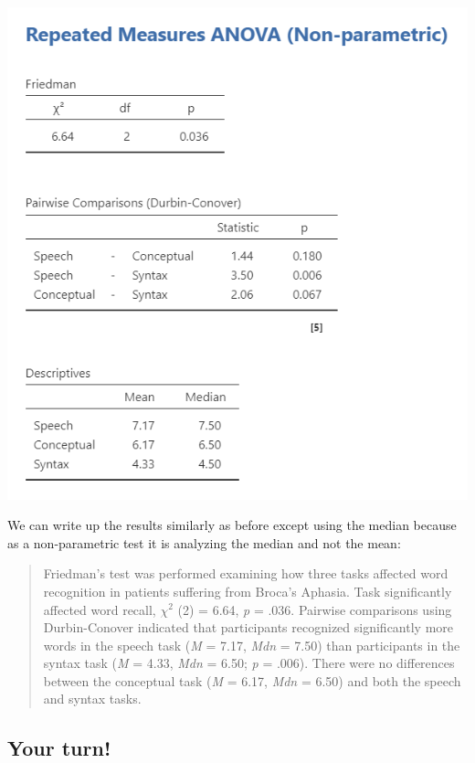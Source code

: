 \documentclass[
]{book}
\begin{document}
\includegraphics{images/05-repeated-measures-anova/rm-anova_friedman.png}

We can write up the results similarly as before except using the median because as a non-parametric test it is analyzing the median and not the mean:

\begin{quote}
Friedman's test was performed examining how three tasks affected word recognition in patients suffering from Broca's Aphasia. Task significantly affected word recall, \(\chi^2\) (2) = 6.64, \emph{p} = .036. Pairwise comparisons using Durbin-Conover indicated that participants recognized significantly more words in the speech task (\emph{M} = 7.17, \emph{Mdn} = 7.50) than participants in the syntax task (\emph{M} = 4.33, \emph{Mdn} = 6.50; \emph{p} = .006). There were no differences between the conceptual task (\emph{M} = 6.17, \emph{Mdn} = 6.50) and both the speech and syntax tasks.
\end{quote}

\hypertarget{your-turn-7}{%
\subsection{Your turn!}\label{your-turn-7}}
\end{document}

